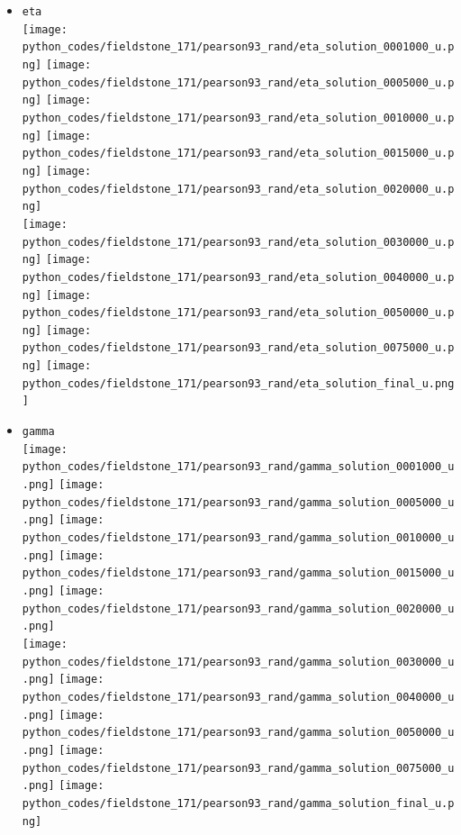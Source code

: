 \begin{itemize}
\item {\tt eta}\\
\texttt{[image: python\_codes/fieldstone\_171/pearson93\_rand/eta\_solution\_0001000\_u.png]}
\texttt{[image: python\_codes/fieldstone\_171/pearson93\_rand/eta\_solution\_0005000\_u.png]}
\texttt{[image: python\_codes/fieldstone\_171/pearson93\_rand/eta\_solution\_0010000\_u.png]}
\texttt{[image: python\_codes/fieldstone\_171/pearson93\_rand/eta\_solution\_0015000\_u.png]}
\texttt{[image: python\_codes/fieldstone\_171/pearson93\_rand/eta\_solution\_0020000\_u.png]}\\
\texttt{[image: python\_codes/fieldstone\_171/pearson93\_rand/eta\_solution\_0030000\_u.png]}
\texttt{[image: python\_codes/fieldstone\_171/pearson93\_rand/eta\_solution\_0040000\_u.png]}
\texttt{[image: python\_codes/fieldstone\_171/pearson93\_rand/eta\_solution\_0050000\_u.png]}
\texttt{[image: python\_codes/fieldstone\_171/pearson93\_rand/eta\_solution\_0075000\_u.png]}
\texttt{[image: python\_codes/fieldstone\_171/pearson93\_rand/eta\_solution\_final\_u.png]}


\item {\tt gamma}\\
\texttt{[image: python\_codes/fieldstone\_171/pearson93\_rand/gamma\_solution\_0001000\_u.png]}
\texttt{[image: python\_codes/fieldstone\_171/pearson93\_rand/gamma\_solution\_0005000\_u.png]}
\texttt{[image: python\_codes/fieldstone\_171/pearson93\_rand/gamma\_solution\_0010000\_u.png]}
\texttt{[image: python\_codes/fieldstone\_171/pearson93\_rand/gamma\_solution\_0015000\_u.png]}
\texttt{[image: python\_codes/fieldstone\_171/pearson93\_rand/gamma\_solution\_0020000\_u.png]}\\
\texttt{[image: python\_codes/fieldstone\_171/pearson93\_rand/gamma\_solution\_0030000\_u.png]}
\texttt{[image: python\_codes/fieldstone\_171/pearson93\_rand/gamma\_solution\_0040000\_u.png]}
\texttt{[image: python\_codes/fieldstone\_171/pearson93\_rand/gamma\_solution\_0050000\_u.png]}
\texttt{[image: python\_codes/fieldstone\_171/pearson93\_rand/gamma\_solution\_0075000\_u.png]}
\texttt{[image: python\_codes/fieldstone\_171/pearson93\_rand/gamma\_solution\_final\_u.png]}



\end{itemize}
